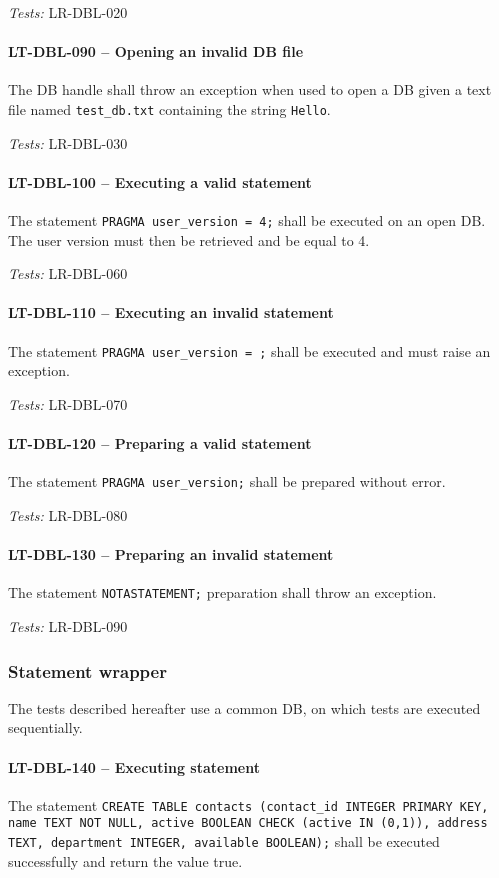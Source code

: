 \textit{Tests: } LR-DBL-020

\paragraph{LT-DBL-090 -- Opening an invalid DB file}
The DB handle shall throw an exception when used to open a DB
given a text file named \lstinline{test_db.txt} containing
the string \lstinline{Hello}.

\textit{Tests: } LR-DBL-030

\paragraph{LT-DBL-100 -- Executing a valid statement}
The statement \lstinline{PRAGMA user_version = 4;} shall be executed
on an open DB. The user version must then be retrieved and be equal
to 4.

\textit{Tests: } LR-DBL-060

\paragraph{LT-DBL-110 -- Executing an invalid statement}
The statement \lstinline{PRAGMA user_version = ;} shall be executed and must
raise an exception.

\textit{Tests: } LR-DBL-070

\paragraph{LT-DBL-120 -- Preparing a valid statement}
The statement \lstinline{PRAGMA user_version;} shall be prepared
without error.

\textit{Tests: } LR-DBL-080

\paragraph{LT-DBL-130 -- Preparing an invalid statement}
The statement \lstinline{NOTASTATEMENT;} preparation shall
throw an exception.

\textit{Tests: } LR-DBL-090

\subsubsection{Statement wrapper}
The tests described hereafter use a common DB, on which tests are
executed sequentially.

\paragraph{LT-DBL-140 -- Executing statement}
The statement
\lstinline{CREATE TABLE contacts (contact_id INTEGER PRIMARY KEY, name TEXT NOT NULL, active BOOLEAN CHECK (active IN (0,1)), address TEXT, department INTEGER, available BOOLEAN);}
shall be executed successfully and return the value true.

